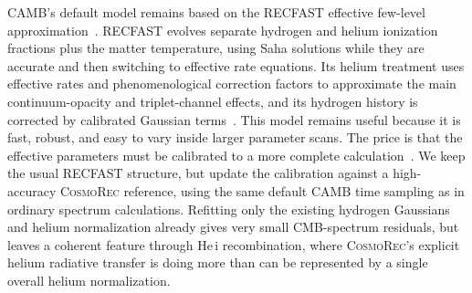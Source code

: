 \documentclass[prd, twocolumn, superscriptaddress, tightenlines, longbibliography, nofootinbib, eqsecnum, amsfonts, amsmath, floatfix, notitlepage]{revtex4-2}
\begin{document}
\textsc{CAMB}'s default model remains based on the \textsc{RECFAST} effective
few-level approximation~\cite{Seager:1999bc,Seager:1999km}. \textsc{RECFAST}
evolves separate hydrogen and helium ionization fractions plus the matter
temperature, using Saha solutions while they are accurate and then switching to
effective rate equations. Its helium treatment uses effective rates and
phenomenological correction factors to approximate the main continuum-opacity and
triplet-channel effects, and its hydrogen history is corrected by calibrated
Gaussian terms~\cite{Wong:2007ym}. This model remains useful because it is fast,
robust, and easy to vary inside larger parameter scans. The price is that the
effective parameters must be calibrated to a more complete
calculation~\cite{Shaw:2011wq}. We keep the usual \textsc{RECFAST} structure,
but update the calibration against a high-accuracy \textsc{CosmoRec} reference,
using the same default \textsc{CAMB} time sampling as in ordinary spectrum
calculations. Refitting only the existing hydrogen Gaussians and helium
normalization already gives very small CMB-spectrum residuals, but leaves a
coherent feature through He\,{\sc i} recombination, where \textsc{CosmoRec}'s
explicit helium radiative transfer is doing more than can be represented by a
single overall helium normalization.
\end{document}
